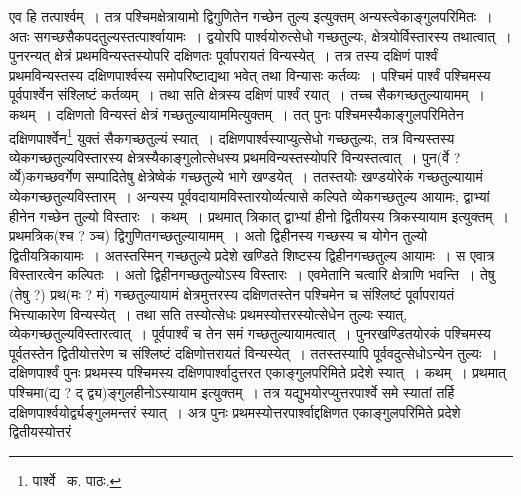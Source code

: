 \documentclass[11pt, openany]{book}
\begin{document}
\noindent एव हि तत्पार्श्वम्~। तत्र पश्चिमक्षेत्रायामो द्विगुणितेन गच्छेन तुल्य इत्युक्तम् अन्यस्त्वेकाङ्गुलपरिमितः~। अतः सगच्छसैकपदतुल्यस्तत्पार्श्वायामः~। द्वयोरपि पार्श्वयोरुत्सेधो गच्छतुल्यः, क्षेत्रयोर्विस्तारस्य तथात्वात्~। पुनरन्यत् क्षेत्रं प्रथमविन्यस्तस्योपरि दक्षिणतः पूर्वापरायतं विन्यस्येत्~। तत्र तस्य दक्षिणं पार्श्वं प्रथमविन्यस्तस्य दक्षिणपार्श्वस्य समोपरिष्टाद्यथा भवेत् तथा विन्यासः कर्तव्यः~। पश्चिमं पार्श्वं पश्चिमस्य पूर्वपार्श्वेन संश्लिष्टं कर्तव्यम्~। तथा सति क्षेत्रस्य दक्षिणं पार्श्वं रयात्~। तच्च सैकगच्छतुल्यायामम्~। कथम्~। दक्षिणतो विन्यस्तं क्षेत्रं गच्छतुल्यायाममित्युक्तम्~। तत् पुनः पश्चिमस्यैकाङ्गुलपरिमितेन दक्षिणपार्श्वेन\renewcommand{\thefootnote}{१}\footnote{पार्श्वे \textendash\ क. पाठः.} युक्तं सैकगच्छतुल्यं स्यात्~। दक्षिणपार्श्वस्याप्युत्सेधो गच्छतुल्यः, तत्र विन्यस्तस्य व्येकगच्छतुल्यविस्तारस्य क्षेत्रस्यैकाङ्गुलोत्सेधस्य प्रथमविन्यस्तस्योपरि विन्यस्तत्वात्~। पुन(र्वे ? र्व्ये)कगच्छवर्गेण सम्पादितेषु क्षेत्रेष्वेकं गच्छतुल्ये भागे खण्डयेत्~। ततस्तयोः खण्डयोरेकं गच्छतुल्यायामं व्येकगच्छतुल्यविस्तारम्~। अन्यस्य पूर्ववदायामविस्तारयोर्व्यत्यासे कल्पिते व्येकगच्छतुल्य आयामः, द्वाभ्यां हीनेन गच्छेन तुल्यो विस्तारः~। कथम्~। प्रथमात् त्रिकात् द्वाभ्यां हीनो द्वितीयस्य त्रिकस्यायाम इत्युक्तम्~। प्रथमत्रिक(श्च ? ञ्च) द्विगुणितगच्छतुल्यायामम्~। अतो द्विहीनस्य गच्छस्य च योगेन तुल्यो द्वितीयत्रिकायामः~। अतस्तस्मिन् गच्छतुल्ये प्रदेशे खण्डिते शिष्टस्य द्विहीनगच्छतुल्य आयामः~। स एवात्र विस्तारत्वेन कल्पितः~। अतो द्विहीनगच्छतुल्योऽस्य विस्तारः~। एवमेतानि चत्वारि क्षेत्राणि भवन्ति~। तेषु (तेषु ?) प्रथ(मः ? मं) गच्छतुल्यायामं क्षेत्रमुत्तरस्य दक्षिणतस्तेन पश्चिमेन च संश्लिष्टं पूर्वापरायतं भित्त्याकारेण विन्यस्येत्~। तथा सति तस्योत्सेधः प्रथमस्योत्तरस्योत्सेधेन तुल्यः स्यात्, व्येकगच्छतुल्यविस्तारत्वात्~। पूर्वपार्श्वं च तेन समं गच्छतुल्यायामत्वात्~। पुनरखण्डितयोरकं पश्चिमस्य पूर्वतस्तेन द्वितीयोत्तरेण च संश्लिष्टं दक्षिणोत्तरायतं विन्यस्येत्~। ततस्तस्यापि पूर्ववदुत्सेधोऽन्येन तुल्यः~। दक्षिणपार्श्वं पुनः प्रथमस्य पश्चिमस्य दक्षिणपार्श्वादुत्तरत एकाङ्गुलपरिमिते प्रदेशे स्यात्~। कथम्~। प्रथमात् पश्चिमा(द्य ? द् द्व्य)ङ्गुलहीनोऽस्यायाम इत्युक्तम्~। तत्र
यद्युभयोरप्युत्तरपार्श्वे समे स्यातां तर्हि दक्षिणपार्श्वयोर्द्व्यङ्गुलमन्तरं स्यात्~। अत्र पुनः प्रथमस्योत्तरपार्श्वाद्दक्षिणत एकाङ्गुलपरिमिते प्रदेशे
द्वितीयस्योत्तरं

\newpage
\end{document}
